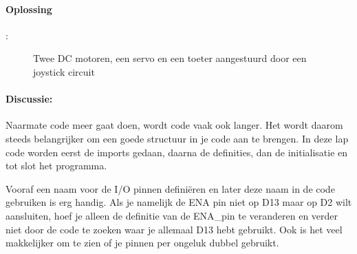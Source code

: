 \paragraph{Oplossing}:
\begin{figure}[H]
	\caption{Twee DC motoren, een servo en een toeter aangestuurd door een joystick circuit}
	\label{fig:DC_Servo_Toeter_Joystick}
\end{figure}



\newpage
\paragraph{Discussie:}	Naarmate code meer gaat doen, wordt code vaak ook langer. Het wordt daarom steeds belangrijker om een goede structuur in je code aan te brengen. In deze lap code worden eerst de imports gedaan, daarna de definities, dan de initialisatie en tot slot het programma. 

Vooraf een naam voor de I/O pinnen defini\"eren en later deze naam in de code gebruiken is erg handig. Als je namelijk de ENA pin niet op D13 maar op D2 wilt aansluiten, hoef je alleen de definitie van de ENA\_pin te veranderen en verder niet door de code te zoeken waar je allemaal D13 hebt gebruikt. Ook is het veel makkelijker om te zien of je pinnen per ongeluk dubbel gebruikt.\\

